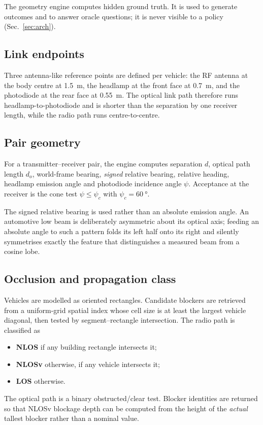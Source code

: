 \documentclass[conference]{IEEEtran}
\begin{document}
The geometry engine computes hidden ground truth. It is used to generate
outcomes and to answer oracle questions; it is never visible to a policy
(Sec.~\ref{sec:arch}).

\subsection{Link endpoints}

Three antenna-like reference points are defined per vehicle: the RF antenna at
the body centre at \SI{1.5}{\meter}, the headlamp at the front face at
\SI{0.7}{\meter}, and the photodiode at the rear face at \SI{0.55}{\meter}.
The optical link path therefore runs headlamp-to-photodiode and is shorter
than the separation by one receiver length, while the radio path runs
centre-to-centre.

\subsection{Pair geometry}

For a transmitter--receiver pair, the engine computes separation $d$, optical
path length $d_o$, world-frame bearing, \emph{signed} relative bearing,
relative heading, headlamp emission angle and photodiode incidence angle
$\psi$. Acceptance at the receiver is the cone test $\psi \le \psi_c$ with
$\psi_c=\SI{60}{\degree}$.

The signed relative bearing is used rather than an absolute emission angle. An
automotive low beam is deliberately asymmetric about its optical axis; feeding
an absolute angle to such a pattern folds its left half onto its right and
silently symmetrises exactly the feature that distinguishes a measured beam
from a cosine lobe.

\subsection{Occlusion and propagation class}

Vehicles are modelled as oriented rectangles. Candidate blockers are retrieved
from a uniform-grid spatial index whose cell size is at least the largest
vehicle diagonal, then tested by segment--rectangle intersection. The radio
path is classified as
\begin{itemize}
\item \textbf{NLOS} if any building rectangle intersects it;
\item \textbf{NLOSv} otherwise, if any vehicle intersects it;
\item \textbf{LOS} otherwise.
\end{itemize}
The optical path is a binary obstructed/clear test. Blocker identities are
returned so that NLOSv blockage depth can be computed from the height of the
\emph{actual} tallest blocker rather than a nominal value.
\end{document}
